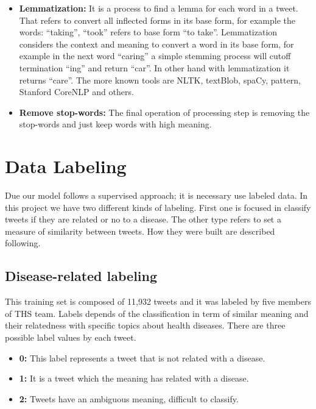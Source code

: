 \documentclass[12pt]{report}
\begin{document}
\begin{itemize}[nolistsep]
	\item \textbf{Lemmatization:} It is a process to find a lemma for each word in a tweet. That refers to convert all inflected forms in its base form, for example the words: “taking”, “took” refers to base form “to take”. Lemmatization considers the context and meaning to convert a word in its base form, for example in the next word “caring” a simple stemming process will cutoff termination “ing” and return “car”. In other hand with lemmatization it returns “care”. The more known tools are \ac{NLTK}, textBlob, spaCy, pattern, Stanford CoreNLP and others. 

	\item \textbf{Remove stop-words:} The final operation of processing step is removing the stop-words and just keep words with high meaning.
\end{itemize}

\section{Data Labeling} \label{data_labeling}

Due our model follows a supervised approach; it is necessary use labeled data. In this project we have two different kinds of labeling. First one is focused in classify tweets if they are related or no to a disease. The other type refers to set a measure of similarity between tweets. How they were built are described following.

\subsection{Disease-related labeling}

This training set is composed of 11,932 tweets and it was labeled by five members of \ac{THS} team. Labels depends of the classification in term of similar meaning and their relatedness with specific topics about health diseases. There are three possible label values by each tweet. 

\begin{itemize} [nolistsep]
	\item \textbf{0:} This label represents a tweet that is not related with a disease. 
	\item \textbf{1:} It is a tweet which the meaning has related with a disease.
	\item \textbf{2:} Tweets have an ambiguous meaning, difficult to classify.
\end{itemize}
\end{document}
